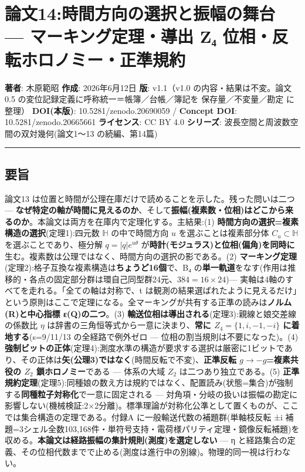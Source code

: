 \documentclass[
]{ltjsarticle}
\author{}
\date{}
\begin{document}
\section{論文14:時間方向の選択と振幅の舞台 --- マーキング定理・導出 Z₄
位相・反転ホロノミー・正準規約}\label{ux8ad6ux658714ux6642ux9593ux65b9ux5411ux306eux9078ux629eux3068ux632fux5e45ux306eux821eux53f0-ux30deux30fcux30adux30f3ux30b0ux5b9aux7406ux5c0eux51fa-zux2084-ux4f4dux76f8ux53cdux8ee2ux30dbux30edux30ceux30dfux30fcux6b63ux6e96ux898fux7d04}

\textbf{著者}: 木原範昭 \textbf{作成}: 2026年6月12日 \textbf{版}:
v1.1（v1.0 の内容・結果は不変。論文0.5
の変位記録定義に呼称統一＝帳簿／台帳／簿記を 保存量／不変量／勘定
に整理） \textbf{DOI(本版)}: 10.5281/zenodo.20690059 / \textbf{Concept
DOI}: 10.5281/zenodo.20665661 \textbf{ライセンス}: CC BY 4.0
\textbf{シリーズ}: 波長空間と周波数空間の双対幾何(論文1〜13
の続編、第14篇)

\begin{center}\rule{0.5\linewidth}{0.5pt}\end{center}

\subsection{要旨}\label{ux8981ux65e8}

論文13 は位置と時間が公理在庫だけで読めることを示した。残った問いは二つ
---
\textbf{なぜ特定の軸が時間に見えるのか}、そして\textbf{振幅(複素数・位相)はどこから来るのか}。本論文は両方を在庫内で定理化する。主結果:(1)
\textbf{時間方向の選択=複素構造の選択}(定理1):四元数 \(\mathbb{H}\)
の中で時間方向 \(u\) を選ぶことは複素部分体 \(C_u\subset\mathbb{H}\)
を選ぶことであり、極分解 \(q=|q|e^{u\theta}\)
が\textbf{時計(モジュラス)と位相(偏角)を同時に}生む。複素数は公理ではなく、時間方向の選択の影である。(2)
\textbf{マーキング定理}(定理2):格子互換な複素構造は\textbf{ちょうど16個}で、B₄
の\textbf{単一軌道}をなす(作用は推移的・各点の固定部分群は環自己同型群24元、\(384=16\times24\))---
実軸は4軸のすべてを走れる。「全ての軸は対称で、t
は観測の結果選ばれたように見えるだけ」という原則はここで定理になる。全マーキングが共有する正準の読みは\textbf{ノルム(R)と中心指標
ε(Q)の二つ}。(3)
\textbf{輸送位相は導出される}(定理3):親線と娘交差線の係数比 \(\eta\)
は辞書の三角恒等式から一意に決まり、\textbf{常に \(Z_4=\{1,i,-1,-i\}\)
に着地する}(s=9/11/13 の全経路で例外ゼロ ---
位相の割当規則は不要になった)。(4)
\textbf{強制ビットの正体}(定理4):測度水準の構造が要求する選択は厳密に1ビットであり、その正体は\textbf{矢(公理3)ではなく}(時間反転で不変)、\textbf{正準反転
\(g\to-g\)=複素共役の \(Z_2\) 鎖ホロノミー}である --- 体系の大域 \(Z_2\)
は二つあり独立である。(5)
\textbf{正準規約定理}(定理5):同種娘の数え方は規約ではなく、配置読み(状態=集合)が強制する\textbf{同種粒子対称化}で一意に固定される
---
対角項・分岐の扱いは振幅の勘定に影響しない(機械検証:2×2分離)。標準理論が対称化公準として置くものが、ここでは集合構造の定理である。付録A
に一般輸送代数の補題群(単軸枝反転 ±i
補題=3シェル全数103,168件・単符号支持・電荷様パリティ定理・鏡像反転補題)を収める。\textbf{本論文は経路振幅の集計規則(測度)を選定しない}
--- η
と経路集合の定義、その位相代数までで止める(測度は進行中の別線)。物理的同一視は行わない。
\end{document}
